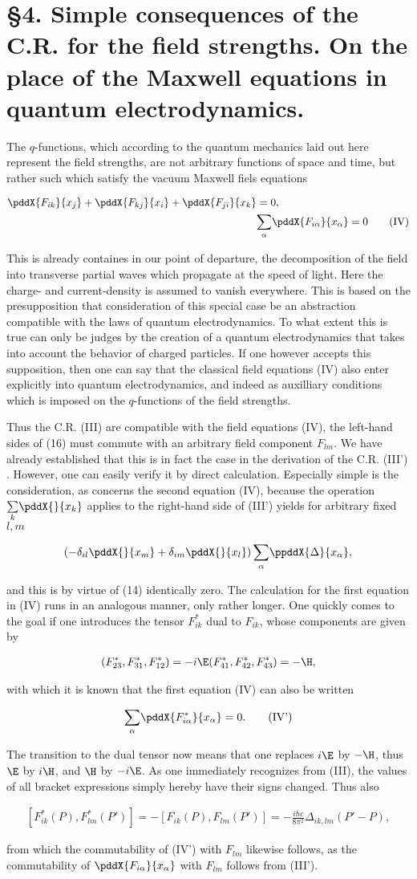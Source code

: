 \documentclass{article}
\newcommand{\nequ}[2]{
\begin{align*}
#1
\tag{#2}
\end{align*}
}
\newcommand{\uequ}[1]{
\begin{align*}
#1
\end{align*}
}
\newcommand{\sumX}[1]{\underset{#1}{\sum}}
\begin{document}
\section*{§4. Simple consequences of the C.R. for the field strengths. On the place of the Maxwell equations in quantum electrodynamics.}

The $q$-functions, which according to the quantum mechanics laid out here represent the field strengths, are not arbitrary functions of space and time, but rather such which satisfy the vacuum Maxwell fiels equations
\nequ{
\pddX{F_{ik}}{x_j} + \pddX{F_{kj}}{x_i} + \pddX{F_{ji}}{x_k} &= 0,\\
&\sumX{\alpha}\pddX{F_{i\alpha}}{x_\alpha}
= 0}{IV}
This is already containes in our point of departure, the decomposition of the field into transverse partial waves which propagate at the speed of light. Here the charge- and current-density is assumed to vanish everywhere. This is based on the presupposition that consideration of this special case be an abstraction compatible with the laws of quantum electrodynamics. To what extent this is true can only be judges by the creation of a quantum electrodynamics that takes into account the behavior of charged particles. If one however accepts this supposition, then one can say that the classical field equations (IV) also enter explicitly into quantum electrodynamics, and indeed as auxilliary conditions which is imposed on the $q$-functions of the field strengths.

Thus the C.R. (III) are compatible with the field equations (IV), the left-hand sides of (16) must commute with an arbitrary field component $F_{lm}$. We have already established that this is in fact the case in the derivation of the C.R. (III') . However, one can easily verify it by direct calculation. Especially simple is the consideration, as concerns the second equation (IV), because the operation $\sumX{k}\pddX{}{x_k}$ applies to the right-hand side of (III') yields for arbitrary fixed $l,m$
\uequ{
\left(-\delta_{il}\pddX{}{x_m} + \delta_{im}\pddX{}{x_l}\right)\sumX{\alpha}\ppddX{\Delta}{x_\alpha},
}
and this is by virtue of (14) identically zero. The calculation for the first equation in (IV) runs in an analogous manner, only rather longer. One quickly comes to the goal if one introduces the tensor $F^*_{ik}$ dual to $F_{ik}$, whose components are given by
\uequ{
(F_{23}^*, F_{31}^*, F_{12}^*) = -i \E(F_{41}^*, F_{42}^*, F_{43}^*) = -\H,
}
with which it is known that the first equation (IV) can also be written
\nequ{
\sumX{\alpha}\pddX{F^*_{i\alpha}}{x_\alpha} = 0.
}{IV'}
The transition to the dual tensor now means that one replaces $i\E$ by $-\H$, thus $\E$ by $i\H$, and $\H$ by $-i\E$. As one immediately recognizes from (III), the values of all bracket expressions simply hereby have their signs changed. Thus also
\nequ{
[F_{ik}^*(P), F_{lm}^*(P')] = -[F_{ik}(P), F_{lm}(P')] = -\frac{ihc}{8\pi^2}\Delta_{ik,lm}(P'-P),
}{III''}
from which the commutability of (IV') with $F_{lm}$ likewise follows, as the commutability of $\pddX{F_{i\alpha}}{x_\alpha}$ with $F_{lm}$ follows from (III').
\end{document}
